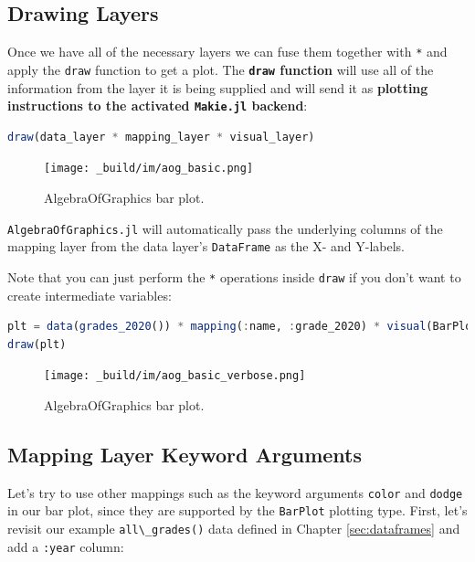 \documentclass[
  notoc %
]{tufte-book}
\newcommand{\passthrough}[1]{#1}
\begin{document}
\hypertarget{sec:aog_layers_draw}{%
\subsection{Drawing Layers}\label{sec:aog_layers_draw}}

Once we have all of the necessary layers we can fuse them together with
\passthrough{\lstinline!*!} and apply the \passthrough{\lstinline!draw!}
function to get a plot. The \textbf{\passthrough{\lstinline!draw!}
function} will use all of the information from the layer it is being
supplied and will send it as \textbf{plotting instructions to the
activated \passthrough{\lstinline!Makie.jl!} backend}:

\begin{lstlisting}[language=Julia]
draw(data_layer * mapping_layer * visual_layer)
\end{lstlisting}

\begin{figure}
\hypertarget{fig:aog_basic}{%
\centering
\texttt{[image: \_build/im/aog\_basic.png]}
\caption{AlgebraOfGraphics bar plot.}\label{fig:aog_basic}
}
\end{figure}

\passthrough{\lstinline!AlgebraOfGraphics.jl!} will automatically pass
the underlying columns of the mapping layer from the data layer's
\passthrough{\lstinline!DataFrame!} as the X- and Y-labels.

Note that you can just perform the \passthrough{\lstinline!*!}
operations inside \passthrough{\lstinline!draw!} if you don't want to
create intermediate variables:

\begin{lstlisting}[language=Julia]
plt = data(grades_2020()) * mapping(:name, :grade_2020) * visual(BarPlot)
draw(plt)
\end{lstlisting}

\begin{figure}
\hypertarget{fig:aog_basic_verbose}{%
\centering
\texttt{[image: \_build/im/aog\_basic\_verbose.png]}
\caption{AlgebraOfGraphics bar plot.}\label{fig:aog_basic_verbose}
}
\end{figure}

\hypertarget{sec:aog_layers_keyword}{%
\subsection{Mapping Layer Keyword
Arguments}\label{sec:aog_layers_keyword}}

Let's try to use other mappings such as the keyword arguments
\passthrough{\lstinline!color!} and \passthrough{\lstinline!dodge!} in
our bar plot, since they are supported by the
\passthrough{\lstinline!BarPlot!} plotting type. First, let's revisit
our example \passthrough{\lstinline!all\_grades()!} data defined in
Chapter \ref{sec:dataframes} and add a \passthrough{\lstinline!:year!}
column:
\end{document}
